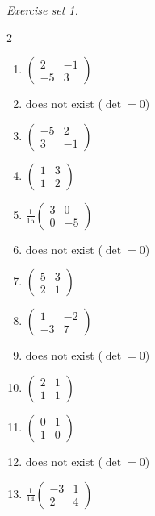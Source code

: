 \par\noindent\emph{Exercise set 1.}\nopagebreak
\begin{multicols}{2}\raggedright
\begin{enumerate}[label=\arabic*., leftmargin=*, itemsep=1pt]
\item $\left(\begin{smallmatrix}2 & -1\\ -5 & 3\end{smallmatrix}\right)$
\item does not exist ($\det=0$)
\item $\left(\begin{smallmatrix}-5 & 2\\ 3 & -1\end{smallmatrix}\right)$
\item $\left(\begin{smallmatrix}1 & 3\\ 1 & 2\end{smallmatrix}\right)$
\item $\frac{1}{15}\left(\begin{smallmatrix}3 & 0\\ 0 & -5\end{smallmatrix}\right)$
\item does not exist ($\det=0$)
\item $\left(\begin{smallmatrix}5 & 3\\ 2 & 1\end{smallmatrix}\right)$
\item $\left(\begin{smallmatrix}1 & -2\\ -3 & 7\end{smallmatrix}\right)$
\item does not exist ($\det=0$)
\item $\left(\begin{smallmatrix}2 & 1\\ 1 & 1\end{smallmatrix}\right)$
\item $\left(\begin{smallmatrix}0 & 1\\ 1 & 0\end{smallmatrix}\right)$
\item does not exist ($\det=0$)
\item $\frac{1}{14}\left(\begin{smallmatrix}-3 & 1\\ 2 & 4\end{smallmatrix}\right)$

\end{enumerate}
\end{multicols}

